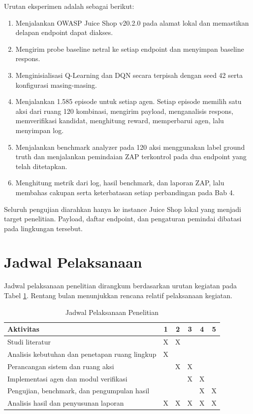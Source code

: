 Urutan eksperimen adalah sebagai berikut:

\begin{enumerate}
    \item Menjalankan OWASP Juice Shop v20.2.0 pada alamat lokal dan memastikan delapan endpoint dapat diakses.
    \item Mengirim probe baseline netral ke setiap endpoint dan menyimpan baseline respons.
    \item Menginisialisasi Q-Learning dan DQN secara terpisah dengan seed 42 serta konfigurasi masing-masing.
    \item Menjalankan 1.585 episode untuk setiap agen. Setiap episode memilih satu aksi dari ruang 120 kombinasi, mengirim payload, menganalisis respons, memverifikasi kandidat, menghitung reward, memperbarui agen, lalu menyimpan log.
    \item Menjalankan benchmark analyzer pada 120 aksi menggunakan label ground truth dan menjalankan pemindaian ZAP terkontrol pada dua endpoint yang telah ditetapkan.
    \item Menghitung metrik dari log, hasil benchmark, dan laporan ZAP, lalu membahas cakupan serta keterbatasan setiap perbandingan pada Bab 4.
\end{enumerate}

Seluruh pengujian diarahkan hanya ke instance Juice Shop lokal yang menjadi target penelitian. Payload, daftar endpoint, dan pengaturan pemindai dibatasi pada lingkungan tersebut.

\section{Jadwal Pelaksanaan}

Jadwal pelaksanaan penelitian dirangkum berdasarkan urutan kegiatan pada Tabel \ref{tab:jadwal_pelaksanaan}. Rentang bulan menunjukkan rencana relatif pelaksanaan kegiatan.

\begin{table}[H]
\centering
\caption{Jadwal Pelaksanaan Penelitian}
\label{tab:jadwal_pelaksanaan}
\begin{tabular}{|p{6.4cm}|c|c|c|c|c|}
\hline
\textbf{Aktivitas} & \textbf{1} & \textbf{2} & \textbf{3} & \textbf{4} & \textbf{5} \\ \hline
Studi literatur & X & X &  &  &  \\ \hline
Analisis kebutuhan dan penetapan ruang lingkup & X &  &  &  &  \\ \hline
Perancangan sistem dan ruang aksi &  & X & X &  &  \\ \hline
Implementasi agen dan modul verifikasi &  &  & X & X &  \\ \hline
Pengujian, benchmark, dan pengumpulan hasil &  &  &  & X & X \\ \hline
Analisis hasil dan penyusunan laporan & X & X & X & X & X \\ \hline
\end{tabular}
\end{table}
